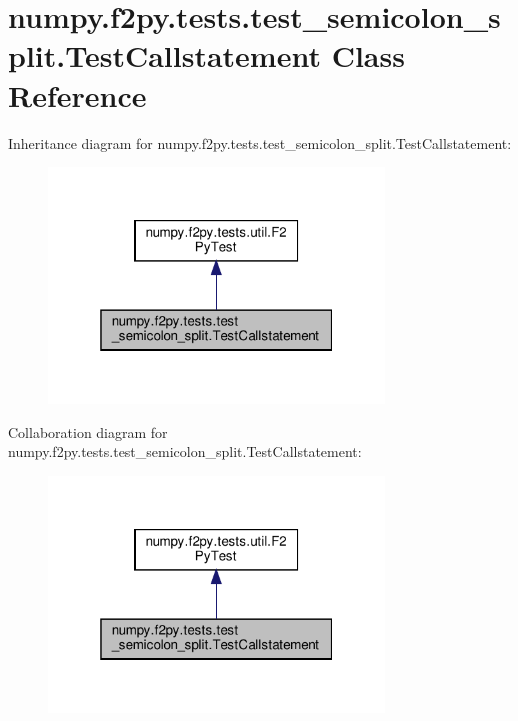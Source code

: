 \hypertarget{classnumpy_1_1f2py_1_1tests_1_1test__semicolon__split_1_1TestCallstatement}{}\section{numpy.\+f2py.\+tests.\+test\+\_\+semicolon\+\_\+split.\+Test\+Callstatement Class Reference}
\label{classnumpy_1_1f2py_1_1tests_1_1test__semicolon__split_1_1TestCallstatement}


Inheritance diagram for numpy.\+f2py.\+tests.\+test\+\_\+semicolon\+\_\+split.\+Test\+Callstatement\+:
\nopagebreak
\begin{figure}[H]
\begin{center}
\leavevmode
\includegraphics[width=253pt]{classnumpy_1_1f2py_1_1tests_1_1test__semicolon__split_1_1TestCallstatement__inherit__graph}
\end{center}
\end{figure}


Collaboration diagram for numpy.\+f2py.\+tests.\+test\+\_\+semicolon\+\_\+split.\+Test\+Callstatement\+:
\nopagebreak
\begin{figure}[H]
\begin{center}
\leavevmode
\includegraphics[width=253pt]{classnumpy_1_1f2py_1_1tests_1_1test__semicolon__split_1_1TestCallstatement__coll__graph}
\end{center}
\end{figure}

